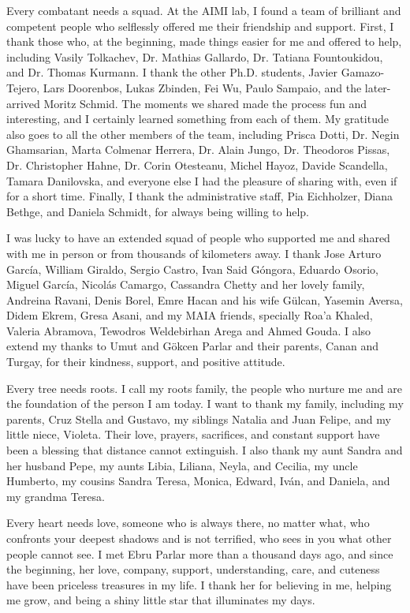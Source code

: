 \begin{acknowledgements}
Every combatant needs a squad. At the AIMI lab, I found a team of brilliant and competent people who selflessly offered me their friendship and support. First, I thank those who, at the beginning, made things easier for me and offered to help, including Vasily Tolkachev, Dr. Mathias Gallardo, Dr. Tatiana Fountoukidou, and Dr. Thomas Kurmann. I thank the other Ph.D. students, Javier Gamazo-Tejero, Lars Doorenbos, Lukas Zbinden, Fei Wu, Paulo Sampaio, and the later-arrived Moritz Schmid. The moments we shared made the process fun and interesting, and I certainly learned something from each of them. My gratitude also goes to all the other members of the team, including Prisca Dotti, Dr. Negin Ghamsarian, Marta Colmenar Herrera, Dr. Alain Jungo, Dr. Theodoros Pissas, Dr. Christopher Hahne, Dr. Corin Otesteanu, Michel Hayoz, Davide Scandella, Tamara Danilovska, and everyone else I had the pleasure of sharing with, even if for a short time. Finally, I thank the administrative staff, Pia Eichholzer, Diana Bethge, and Daniela Schmidt, for always being willing to help.

\medskip

I was lucky to have an extended squad of people who supported me and shared with me in person or from thousands of kilometers away.  I thank Jose Arturo García, William Giraldo, Sergio Castro, Ivan Said Góngora, Eduardo Osorio, Miguel García, Nicolás Camargo, Cassandra Chetty and her lovely family, Andreina Ravani, Denis Borel, Emre Hacan and his wife Gülcan, Yasemin Aversa, Didem Ekrem, Gresa Asani, and my MAIA friends, specially Roa'a Khaled, Valeria Abramova, Tewodros Weldebirhan Arega and Ahmed Gouda. I also extend my thanks to Umut and Gökcen Parlar and their parents, Canan and Turgay, for their kindness, support, and positive attitude.

\medskip

Every tree needs roots. I call my roots family, the people who nurture me and are the foundation of the person I am today. I want to thank my family, including my parents, Cruz Stella and Gustavo, my siblings Natalia and Juan Felipe, and my little niece, Violeta. Their love, prayers, sacrifices, and constant support have been a blessing that distance cannot extinguish. I also thank my aunt Sandra and her husband Pepe, my aunts Libia, Liliana, Neyla, and Cecilia, my uncle Humberto, my cousins Sandra Teresa, Monica, Edward, Iván, and Daniela, and my grandma Teresa.

\medskip

Every heart needs love, someone who is always there, no matter what, who confronts your deepest shadows and is not terrified, who sees in you what other people cannot see. I met Ebru Parlar more than a thousand days ago, and since the beginning, her love, company, support, understanding, care, and cuteness have been priceless treasures in my life. I thank her for believing in me, helping me grow, and being a shiny little star that illuminates my days. 



\end{acknowledgements}